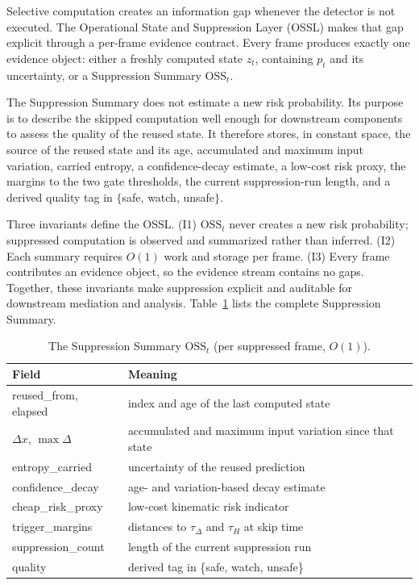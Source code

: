 \documentclass[conference]{IEEEtran}
\newcommand{\osst}{\mathrm{OSS}_t}
\begin{document}
Selective computation creates an information gap whenever the detector is
not executed. The Operational State and Suppression Layer (OSSL) makes
that gap explicit through a per-frame evidence contract. Every frame
produces exactly one evidence object: either a freshly computed state
$z_t$, containing $p_t$ and its uncertainty, or a Suppression Summary
$\osst$.

The Suppression Summary does not estimate a new risk probability. Its
purpose is to describe the skipped computation well enough for downstream
components to assess the quality of the reused state. It therefore stores,
in constant space, the source of the reused state and its age, accumulated
and maximum input variation, carried entropy, a confidence-decay
estimate, a low-cost risk proxy, the margins to the two gate thresholds,
the current suppression-run length, and a derived quality tag in
$\{$safe, watch, unsafe$\}$.

Three invariants define the OSSL. (I1) $\osst$ never creates a new risk
probability; suppressed computation is observed and summarized rather
than inferred. (I2) Each summary requires $O(1)$ work and storage per
frame. (I3) Every frame contributes an evidence object, so the evidence
stream contains no gaps. Together, these invariants make suppression
explicit and auditable for downstream mediation and analysis.
Table~\ref{tab:oss} lists the complete Suppression Summary.

\begin{table}[!t]
\caption{The Suppression Summary $\osst$ (per suppressed frame, $O(1)$).}
\label{tab:oss}
\centering\scriptsize
\setlength{\tabcolsep}{4pt}
\begin{tabular}{@{}lp{5.3cm}@{}}
\toprule
Field & Meaning\\
\midrule
reused\_from, elapsed & index and age of the last computed state\\
$\Delta x$, $\max\Delta$ & accumulated and maximum input variation
  since that state\\
entropy\_carried & uncertainty of the reused prediction\\
confidence\_decay & age- and variation-based decay estimate\\
cheap\_risk\_proxy & low-cost kinematic risk indicator\\
trigger\_margins & distances to $\tau_\Delta$ and $\tau_H$ at skip time\\
suppression\_count & length of the current suppression run\\
quality & derived tag in \{safe, watch, unsafe\}\\
\bottomrule
\end{tabular}
\end{table}
\end{document}

